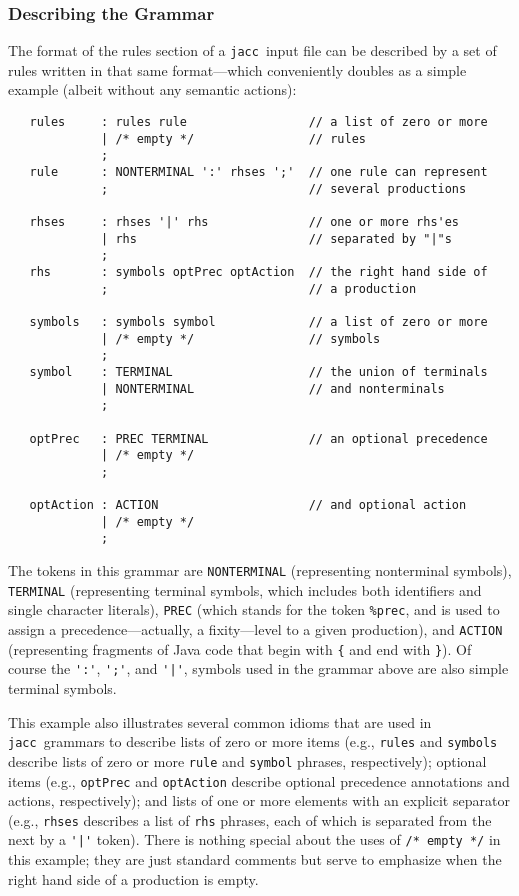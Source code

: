 \documentclass[12pt]{article}
\def\jacc{{\tt jacc}}
\begin{document}
\subsubsection{Describing the Grammar}
The format of the rules section of a \jacc\ input file can
be described by a set of rules written in that same format---which
conveniently doubles as a simple example (albeit without any semantic
actions):
{\small%
\begin{verbatim}
   rules     : rules rule                 // a list of zero or more
             | /* empty */                // rules
             ;
   rule      : NONTERMINAL ':' rhses ';'  // one rule can represent
             ;                            // several productions

   rhses     : rhses '|' rhs              // one or more rhs'es
             | rhs                        // separated by "|"s
             ;
   rhs       : symbols optPrec optAction  // the right hand side of
             ;                            // a production

   symbols   : symbols symbol             // a list of zero or more
             | /* empty */                // symbols
             ;
   symbol    : TERMINAL                   // the union of terminals
             | NONTERMINAL                // and nonterminals
             ;

   optPrec   : PREC TERMINAL              // an optional precedence
             | /* empty */
             ;

   optAction : ACTION                     // and optional action
             | /* empty */
             ;
\end{verbatim}
}%
The tokens in this grammar are \verb"NONTERMINAL" (representing
nonterminal symbols), \verb"TERMINAL" (representing terminal
symbols, which includes both identifiers and single character
literals), \verb"PREC" (which stands for the token \verb"%prec",
and is used to assign a precedence---actually, a fixity---level
to a given production), and \verb"ACTION" (representing fragments
of Java code that begin with \verb"{" and end with \verb"}").
Of course the \verb"':'", \verb"';'", and \verb"'|'", symbols
used in the grammar above are also simple terminal symbols.

This example also illustrates several common idioms that are used
in \jacc\ grammars to describe lists of zero or more items (e.g.,
\verb"rules" and \verb"symbols" describe lists of zero or more
\verb"rule" and \verb"symbol" phrases, respectively); optional
items (e.g., \verb"optPrec" and \verb"optAction" describe
optional precedence annotations and actions, respectively);
and lists of one or more elements with an explicit separator
(e.g., \verb"rhses" describes a list of \verb"rhs" phrases,
each of which is separated from the next by a \verb"'|'" token).
There is nothing special about the uses of \verb"/* empty */"
in this example; they are just standard comments but serve to
emphasize when the right hand side of a production is empty.
\end{document}
